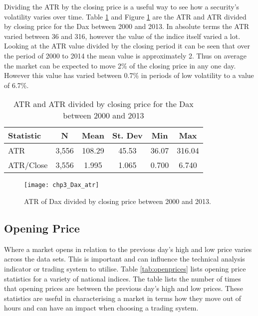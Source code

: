 Dividing the ATR by the closing price is a useful way to see how a security's volatility varies over time. Table \ref{tab:atr_dax} and Figure \ref{fig:Dax_atr} are the ATR and ATR divided by closing price for the Dax between 2000 and 2013. In absolute terms the ATR varied between 36 and 316, however the value of the indice itself varied a lot. Looking at the ATR value divided by the closing period it can be seen that over the period of 2000 to 2014 the mean value is approximately 2. Thus on average the market can be expected to move 2\% of the closing price in any one day. However this value has varied between 0.7\% in periods of low volatility to a value of 6.7\%.

\begin{table}[!htbp] \centering 
  \caption[Average True Range of Dax]{ATR and ATR divided by closing price for the Dax between 2000 and 2013} 
  \label{tab:atr_dax} 
\begin{tabular}{lccccc} 
\toprule
Statistic & N & Mean & St. Dev & Min & Max \\ 
\midrule
ATR & 3,556 & 108.29 & 45.53 & 36.07 & 316.04 \\ 
ATR/Close & 3,556 & 1.995 & 1.065 & 0.700 & 6.740 \\ 
\bottomrule
\end{tabular} 
\end{table} 

\begin{figure}[tbph]
\centering
\texttt{[image: chp3\_Dax\_atr]}
\caption[ATR of Dax Divided by Closing Price]{ATR of Dax divided by closing price between 2000 and 2013.}
\label{fig:Dax_atr}
\end{figure}

\subsection{Opening Price}
Where a market opens in relation to the previous day's high and low price varies across the data sets. This is important and can influence the technical analysis indicator or trading system to utilise. Table \ref{tab:openprices} lists opening price statistics for a variety of national indices. The table lists the number of times that opening prices are between the previous day's high and low prices. These statistics are useful in characterising a market in terms how they move out of hours and can have an impact when choosing a trading system.

